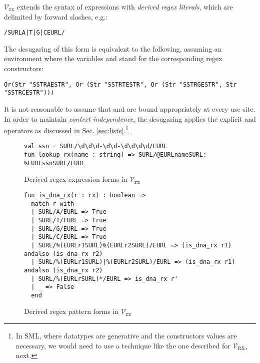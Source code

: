 $\mathcal{V}_\texttt{rx}$ extends the syntax of expressions with  \emph{derived regex literals}, which are delimited by forward slashes, e.g.:
\begin{lstlisting}[numbers=none]
/SURLA|T|G|CEURL/
\end{lstlisting}
The desugaring of this form is equivalent to the following, assuming an environment where the variables  and  stand for the corresponding regex constructors:
\begin{lstlisting}[numbers=none]
Or(Str "SSTRAESTR", Or (Str "SSTRTESTR", Or (Str "SSTRGESTR", Str "SSTRCESTR")))
\end{lstlisting}
It is not reasonable to assume that  and  are bound appropriately at every use site. In order to maintain \emph{context independence}, the desugaring applies the explicit  and  operators as discussed in Sec. \ref{sec:lists}.\footnote{In SML, where datatypes are generative and the constructors values are necessary, we would need to use a technique like the one described for $\mathcal{V}_\text{RX}$, next.}

\begin{figure}
\begin{lstlisting}[numbers=none]
val ssn = SURL/\d\d\d-\d\d-\d\d\d\d/EURL
fun lookup_rx(name : string) => SURL/@EURLnameSURL: %EURLssnSURL/EURL
\end{lstlisting}
\caption{Derived regex expression forms in $\mathcal{V}_\texttt{rx}$}
\label{fig:derived-spliced-subexpressions}
\end{figure}
\begin{figure}
\begin{lstlisting}[numbers=none]
fun is_dna_rx(r : rx) : boolean => 
  match r with 
  | SURL/A/EURL => True
  | SURL/T/EURL => True
  | SURL/G/EURL => True
  | SURL/C/EURL => True
  | SURL/%(EURLr1SURL)%(EURLr2SURL)/EURL => (is_dna_rx r1) andalso (is_dna_rx r2)
  | SURL/%(EURLr1SURL)|%(EURLr2SURL)/EURL => (is_dna_rx r1) andalso (is_dna_rx r2)
  | SURL/%(EURLrSURL)*/EURL => is_dna_rx r'
  | _ => False
  end
\end{lstlisting}
\vspace{-5px}
\caption{Derived regex pattern forms in $\mathcal{V}_\texttt{rx}$}
\label{fig:derived-pattern-syntax}
\end{figure}

